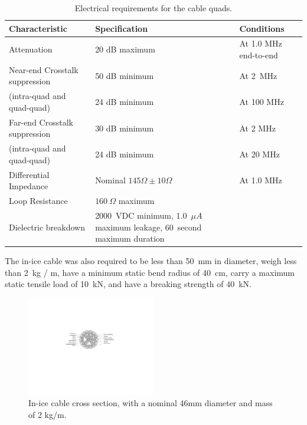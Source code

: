 \begin{table}[h]
  \centering
  \caption{Electrical requirements for the cable quads.} 
  \begin{tabularx}{\textwidth}{ l X  X  }
    \toprule
    Characteristic& Specification & Conditions \\
    \midrule

    Attenuation & 20 dB maximum & At 1.0 MHz end-to-end \\
%

   Near-end Crosstalk suppression& 50 dB minimum & At 2~MHz \\
(intra-quad and quad-quad)&24 dB minimum& At 100 MHz\\
   Far-end Crosstalk suppression& 30 dB minimum & At 2 MHz \\
(intra-quad and quad-quad)&24 dB minimum& At 20 MHz\\


    Differential Impedance & Nominal $145\Omega \pm 10\Omega$ & At 1.0 MHz \\

    Loop Resistance & $160~\Omega$ maximum & \\

    Dielectric breakdown & 2000~VDC minimum, 1.0~$\mu A$ maximum leakage, 60~second
    maximum duration & \\
    \bottomrule  
  \end{tabularx}
  \label{tab:quad_requirements}
\end{table}

 The in-ice cable was also required to be less than 50~mm in
 diameter, weigh less than 2~kg / m, have a minimum static bend radius of 40~cm,
 carry a maximum static tensile load of 10~kN, and have a breaking strength
 of 40~kN.
 
\begin{figure}
  \centering
  \includegraphics[width=0.5\textwidth]{graphics/cables/labeled_inice_xsection.pdf}
  \caption{\label{fig:cable_xsection}In-ice cable cross
    section, with a nominal 46mm diameter and mass of 2 kg/m.} 
\end{figure}

